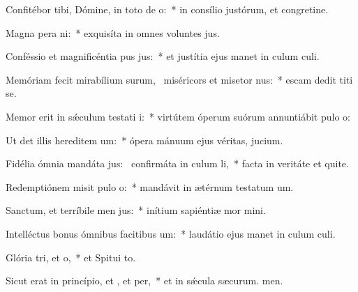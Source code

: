 \item Confitébor tibi, Dómine, in toto de o:~* in consílio justórum, et congretine.
\item Magna pera ni:~* exquisíta in omnes voluntes jus.
\item Conféssio et magnificéntia pus jus:~* et justítia ejus manet in culum culi.
\item Memóriam fecit mirabílium surum,~\pscross{} miséricors et misetor nus:~* escam dedit titi se.
\item Memor erit in sǽculum testati i:~* virtútem óperum suórum annuntiábit pulo o:
\item Ut det illis hereditem um:~* ópera mánuum ejus véritas,  jucium.
\item Fidélia ómnia mandáta jus:~\pscross{} confirmáta in culum li,~* facta in veritáte et quite.
\item Redemptiónem misit pulo o:~* mandávit in ætérnum testatum um.
\item Sanctum, et terríbile men jus:~* inítium sapiéntiæ mor mini.
\item Intelléctus bonus ómnibus facitibus um:~* laudátio ejus manet in culum culi.
\item Glória tri, et o,~* et Spitui to.
\item Sicut erat in princípio, et , et per,~* et in sǽcula sæcurum. men.
